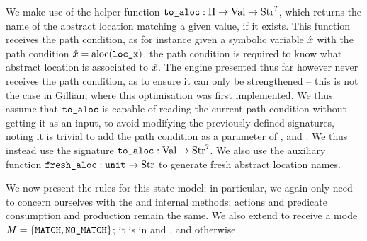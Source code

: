 We make use of the helper function ${\texttt{to\_aloc}:\Pi\rightarrow \text{Val}\rightarrow \text{Str}^?}$, which returns the name of the abstract location matching a given value, if it exists.  This function receives the path condition, as for instance given a symbolic variable $\hat{x}$ with the path condition ${\hat{x} = \text{aloc}(\texttt{loc\_x})}$, the path condition is required to know what abstract location is associated to $\hat{x}$. The engine presented thus far however never receives the path condition, as to ensure it can only be strengthened -- this is not the case in Gillian, where this optimisation was first implemented. We thus assume that $\texttt{to\_aloc}$ is capable of reading the current path condition without getting it as an input, to avoid modifying the previously defined signatures, noting it is trivial to add the path condition as a parameter of \execac, \consume{} and \produce. We thus instead use the signature ${\texttt{to\_aloc}: \text{Val}\rightarrow\text{Str}^?}$. We also use the auxiliary function $\texttt{fresh\_aloc}: \texttt{unit} \rightarrow \text{Str}$ to generate fresh abstract location names.

We now present the rules for this state model; in particular, we again only need to concern ourselves with the  and  internal methods; actions and predicate consumption and production remain the same. We also extend  to receive a mode ${M= \{\texttt{MATCH},\texttt{NO\_MATCH}\}}$; it is  in \produce{} and \consume{}, and  otherwise.

